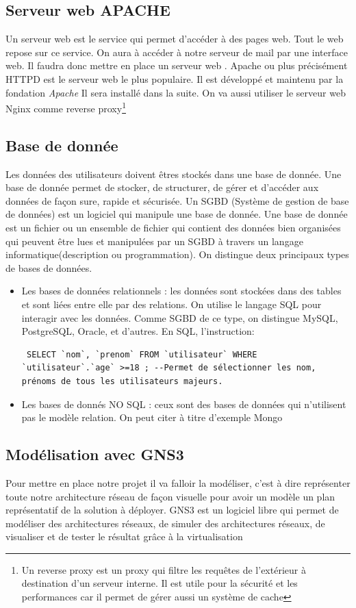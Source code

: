 \documentclass[a4paper,12pt,french]{report} %
\begin{document}
\subsection{Serveur web APACHE}
Un serveur web est le service qui permet d'accéder à des pages web. Tout le web repose sur ce service. On aura à accéder à notre serveur de mail par une interface web. Il faudra donc mettre en place un serveur web . Apache ou plus précisément HTTPD est le serveur web le plus populaire. Il est développé et maintenu par la fondation \emph{Apache} Il sera installé dans la suite. On va aussi utiliser le serveur web Nginx comme reverse proxy\footnote{Un reverse proxy est un proxy qui filtre les requêtes de l'extérieur à destination d'un serveur interne. Il est utile pour la sécurité et les performances car il permet de gérer aussi un système de cache}
\subsection{Base de donnée}
Les données des utilisateurs doivent êtres stockés dans une base de donnée. Une base de donnée permet de stocker, de structurer, de gérer et d'accéder aux données de façon sure, rapide et sécurisée. Un SGBD (Système de gestion de base de données) est un logiciel qui manipule une base de donnée. Une base de donnée est un fichier ou un ensemble de fichier qui contient des données bien organisées qui peuvent être lues et manipulées par un SGBD à travers un langage informatique(description ou programmation). On distingue deux principaux types de bases de données.
 \begin{itemize}
 \item Les bases de données relationnels : les données sont stockées dans des tables et sont liées entre elle par des relations. On utilise le langage SQL pour interagir avec les données. Comme SGBD de ce type, on distingue MySQL, PostgreSQL, Oracle, et d'autres. En SQL, l'instruction:
 
 \begin{verbatim}
 SELECT `nom`, `prenom` FROM `utilisateur` WHERE `utilisateur`.`age` >=18 ; --Permet de sélectionner les nom, prénoms de tous les utilisateurs majeurs.
 \end{verbatim}
 \item Les bases de donnés NO SQL : ceux sont des bases de données qui n'utilisent pas le modèle relation. On  peut citer à titre d'exemple Mongo
 \end{itemize}
\subsection{Modélisation avec GNS3}
Pour mettre en place notre projet il va falloir la modéliser, c'est à dire représenter toute notre architecture réseau de façon visuelle pour avoir un modèle un plan représentatif de la solution à déployer. GNS3 est un logiciel libre qui permet de modéliser des architectures réseaux, de simuler des architectures réseaux, de visualiser et de tester le résultat grâce à la virtualisation 
\end{document}
